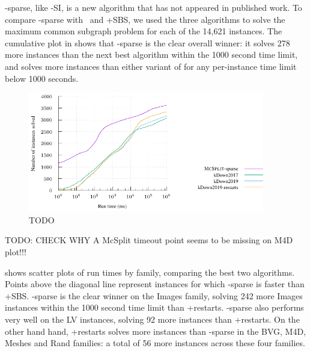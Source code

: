 \McSplit-sparse, like \McSplit-SI, is a new algorithm that
has not appeared in published work.
To compare \McSplit-sparse with \kDown\ and \kDown+SBS,
we used the three algorithms to solve the maximum
common subgraph problem for each of the 14,621 instances.
The cumulative plot in  
shows that \McSplit-sparse is the clear overall winner: it solves
278 more instances than the next best algorithm within the 1000 second
time limit, and solves more instances than either variant of \kDown
for any per-instance time limit below 1000 seconds.

\begin{figure}[htb]
    \centering
    \includegraphics*[width=0.92\textwidth]{14b-mcsplit-induced-si/sip-instances-mcis-experiment/experiment/plots/cumulative.pdf}
    \caption{TODO}
    \label{figure:mcsplit-sparse-cumulative}
\end{figure}

TODO: CHECK WHY A McSplit timeout point seems to be missing on M4D plot!!!

 shows scatter plots
of run times by family, comparing the best two algorithms.  Points
above the diagonal line represent instances for which \McSplit-sparse
is faster than \kDown+SBS. 
\McSplit-sparse is the clear winner on the Images family,
solving 242 more Images instances
within the 1000 second time limit than \kDown+restarts.
\McSplit-sparse also performs very well on the LV instances,
solving 92 more instances than \kDown+restarts.
On the other hand
hand, \kDown+restarts solves more instances than \McSplit-sparse in the
BVG, M4D, Meshes and Rand families: a total of 56 more instances across these
four families.


